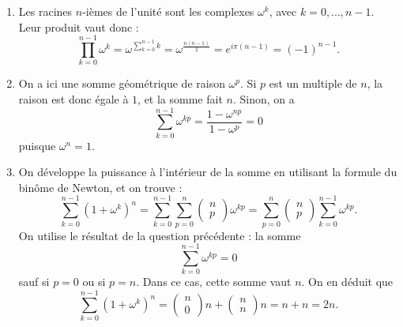 \begin{enumerate}
\item Les racines $n$-ièmes de l'unité sont les complexes $\omega^k$, avec $k=0,...,n-1$. Leur produit vaut donc : 
\[ \prod_{k=0}^{n-1} \omega^k = \omega^{\sum_{k=0}^{n-1}k } = \omega^{\frac{n(n-1)}{2}} = e^{i \pi (n-1)} = (-1)^{n-1}.\]
\item On a ici une somme géométrique de raison $\omega^p$. Si $p$ est un multiple de $n$, la raison est donc égale à $1$, et la somme fait $n$. Sinon, on a 
\[ \sum_{k=0}^{n-1} \omega^{kp} = \frac{1-\omega^{np}}{1-\omega^p} = 0\]
 puisque $\omega^n=1$.
 \item On développe la puissance à l'intérieur de la somme en utilisant la formule du binôme de Newton, et on trouve :
 \[ \sum_{k=0}^{n-1} (1 + \omega^k)^n = \sum_{k=0}^{n-1} \sum_{p=0}^n \begin{pmatrix}
  n \\ p
\end{pmatrix} \omega^{kp} = \sum_{p=0}^{n} \begin{pmatrix}
  n \\ p
\end{pmatrix} \sum_{k=0}^{n-1}  \omega^{kp}.\]
 On utilise le résultat de la question précédente : la somme 
 \[ \sum_{k=0}^{n-1} \omega^{kp} = 0\]
sauf si $p=0$ ou si $p=n$. Dans ce cas, cette somme vaut $n$. On en déduit que 
\[  \sum_{k=0}^{n-1} (1 + \omega^k)^n = \begin{pmatrix}
  n \\ 0
\end{pmatrix} n + \begin{pmatrix}
  n \\ n
\end{pmatrix} n = n + n = 2n.\]
\end{enumerate}